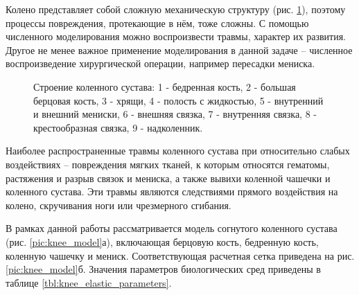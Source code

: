 Колено представляет собой сложную механическую структуру (рис. \ref{pic:knee_scheme}), поэтому процессы повреждения, протекающие в нём, тоже сложны. С помощью численного моделирования можно воспроизвести травмы, характер их развития. Другое не менее важное применение моделирования в данной задаче -- численное воспроизведение хирургической операции, например пересадки мениска. 

\begin{figure}[h]
\caption{Строение коленного сустава: 1 - бедренная кость, 2 - большая берцовая кость, 3 - хрящи, 4 - полость с жидкостью, 5 - внутренний и внешний мениски, 6 - внешняя связка, 7 - внутренняя связка, 8 - крестообразная связка, 9 - надколенник.}
\label{pic:knee_scheme}
\end{figure}

\clearpage
\newpage

Наиболее распространенные травмы коленного сустава при относительно слабых воздействиях -- повреждения мягких тканей, к которым относятся гематомы, растяжения и разрыв связок и мениска, а также вывихи коленной чашечки и коленного сустава. Эти травмы являются следствиями прямого воздействия на колено, скручивания ноги или чрезмерного сгибания.

В рамках данной работы рассматривается модель согнутого коленного сустава (рис. \ref{pic:knee_model}а), включающая берцовую кость, бедренную кость, коленную чашечку и мениск. Соответствующая расчетная сетка приведена на рис. \ref{pic:knee_model}б. Значения параметров биологических сред приведены в таблице \ref{tbl:knee_elastic_parameters}.



